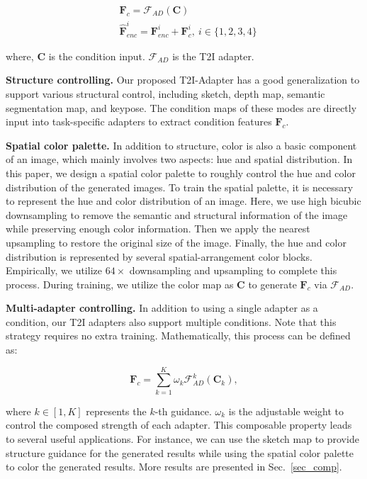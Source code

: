 \begin{align}
    &\mathbf{F}_c = \mathcal{F}_{AD}(\mathbf{C})\\
    &\hat{\mathbf{F}}_{enc}^{i} = \mathbf{F}_{enc}^{i} + \mathbf{F}_{c}^{i},\ i\in \{1,2,3,4\}
\end{align}

where, $\mathbf{C}$ is the condition input. $\mathcal{F}_{AD}$ is the T2I adapter.

\textbf{Structure controlling.} Our proposed T2I-Adapter has a good generalization to support various structural control, including sketch, depth map, semantic segmentation map, and keypose. The condition maps of these modes are directly input into task-specific adapters to extract condition features $\mathbf{F}_{c}$.

 \textbf{Spatial color palette.} In addition to structure, color is also a basic component of an image, which mainly involves two aspects: hue and spatial distribution. In this paper, we design a spatial color palette to roughly control the hue and color distribution of the generated images. To train the spatial palette, it is necessary to represent the hue and color distribution of an image. Here, we use high bicubic downsampling to remove the semantic and structural information of the image while preserving enough color information. Then we apply the nearest upsampling to restore the original size of the image. Finally, the hue and color distribution is represented by several spatial-arrangement color blocks. Empirically, we utilize $64\times$ downsampling and upsampling to complete this process. During training, we utilize the color map as $\mathbf{C}$ to generate $\mathbf{F}_c$ via $\mathcal{F}_{AD}$. 

\textbf{Multi-adapter controlling.} In addition to using a single adapter as a condition, our T2I adapters also support multiple conditions. Note that this strategy requires no extra training. Mathematically, this process can be defined as:

\begin{equation}
    \mathbf{F}_c = \sum_{k=1}^K \omega_k \mathcal{F}_{AD}^k(\mathbf{C}_k),
    \label{eq_compose}
\end{equation}

where $k\in [1, K]$ represents the $k$-th guidance. $\omega_k$ is the adjustable weight to control the composed strength of each adapter. This composable property leads to several useful applications. For instance, we can use the sketch map to provide structure guidance for the generated results while using the spatial color palette to color the generated results. More results are presented in Sec.~\ref{sec_comp}.

